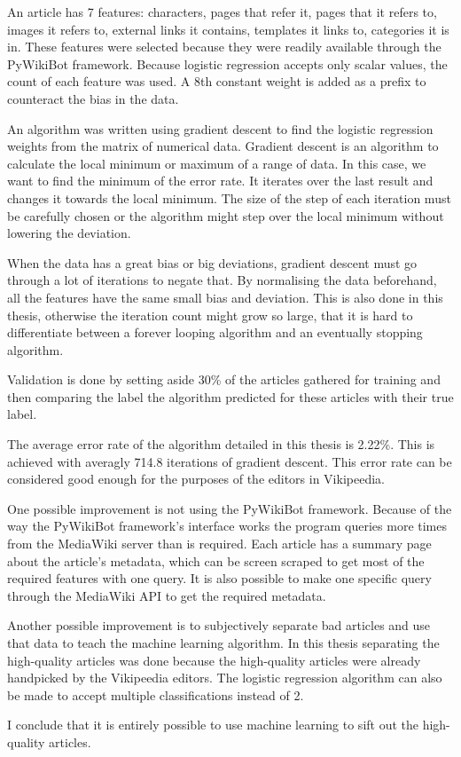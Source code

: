 \documentclass[a4paper, titlepage, 12pt]{article}
\begin{document}
An article has 7 features: characters, pages that refer it, pages that it refers
to, images it refers to, external links it contains, templates it links to,
categories it is in. These features were selected because they were readily
available through the PyWikiBot framework. Because logistic regression accepts
only scalar values, the count of each feature was used. A 8th constant weight is
added as a prefix to counteract the bias in the data.

An algorithm was written using gradient descent to find the logistic regression
weights from the matrix of numerical data. Gradient descent is an algorithm to
calculate the local minimum or maximum of a range of data. In this case, we want
to find the minimum of the error rate. It iterates over the last result and
changes it towards the local minimum. The size of the step of each iteration
must be carefully chosen or the algorithm might step over the local minimum
without lowering the deviation.

When the data has a great bias or big deviations, gradient descent must go
through a lot of iterations to negate that. By normalising the data beforehand,
all the features have the same small bias and deviation. This is also done in
this thesis, otherwise the iteration count might grow so large, that it is hard
to differentiate between a forever looping algorithm and an eventually stopping
algorithm.

Validation is done by setting aside 30\% of the articles gathered for training
and then comparing the label the algorithm predicted for these articles with
their true label.

The average error rate of the algorithm detailed in this thesis is 2.22\%. This
is achieved with averagly 714.8 iterations of gradient descent. This error rate
can be considered good enough for the purposes of the editors in Vikipeedia.

One possible improvement is not using the PyWikiBot framework. Because of the
way the PyWikiBot framework's interface works the program queries more times from
the MediaWiki server than is required. Each article has a summary page about the
article's metadata, which can be screen scraped to get most of the required
features with one query. It is also possible to make one specific query through
the MediaWiki API to get the required metadata.

Another possible improvement is to subjectively separate bad articles
and use that data to teach the machine learning algorithm. In this thesis
separating the high-quality articles was done because the high-quality articles
were already handpicked by the Vikipeedia editors. The logistic regression
algorithm can also be made to accept multiple classifications instead of 2.

I conclude that it is entirely possible to use machine learning to sift out
the high-quality articles.



\end{document}
